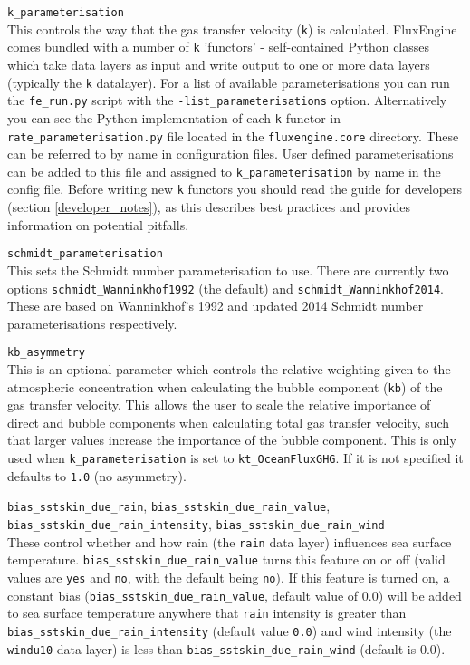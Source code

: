 \documentclass[]{scrartcl}
\newcommand{\conflistingsep}{\vspace{0.40cm}}
\begin{document}
\conflistingsep \noindent \texttt{k\_parameterisation}\\
This controls the way that the gas transfer velocity (\texttt{k}) is calculated. FluxEngine comes bundled with a number of \texttt{k} 'functors' - self-contained Python classes which take data layers as input and write output to one or more data layers (typically the \texttt{k} datalayer). For a list of available parameterisations you can run the \texttt{fe\_run.py} script with the \texttt{-list\_parameterisations} option. Alternatively you can see the Python implementation of each \texttt{k} functor in \texttt{rate\_parameterisation.py} file located in the \texttt{fluxengine.core} directory. These can be referred to by name in configuration files. User defined parameterisations can be added to this file and assigned to \texttt{k\_parameterisation} by name in the config file. Before writing new \texttt{k} functors you should read the guide for developers (section \ref{developer_notes}), as this describes best practices and provides information on potential pitfalls.

\conflistingsep \noindent \texttt{schmidt\_parameterisation}\\
This sets the Schmidt number parameterisation to use. There are currently two options \texttt{schmidt\_Wanninkhof1992} (the default) and \texttt{schmidt\_Wanninkhof2014}. These are based  on Wanninkhof's 1992 \cite{Wanninkhof1992} and updated 2014 \cite{Wanninkhof12014} Schmidt number parameterisations respectively.

\conflistingsep \noindent \texttt{kb\_asymmetry}\\
This is an optional parameter which controls the relative weighting given to the atmospheric concentration when calculating the bubble component (\texttt{kb}) of the gas transfer velocity. This allows the user to scale the relative importance of direct and bubble components when calculating total gas transfer velocity, such that larger values increase the importance of the bubble component. This is only used when \texttt{k\_parameterisation} is set to \texttt{kt\_OceanFluxGHG}. If it is not specified it defaults to \texttt{1.0} (no asymmetry).

\conflistingsep \noindent \texttt{bias\_sstskin\_due\_rain}, \texttt{bias\_sstskin\_due\_rain\_value}, \texttt{bias\_sstskin\_due\_rain\_intensity}, \texttt{bias\_sstskin\_due\_rain\_wind}\\
These control whether and how rain (the \texttt{rain} data layer) influences sea surface temperature. \texttt{bias\_sstskin\_due\_rain\_value} turns this feature on or off (valid values are \texttt{yes} and \texttt{no}, with the default being \texttt{no}). If this feature is turned on, a constant bias (\texttt{bias\_sstskin\_due\_rain\_value}, default value of $0.0$) will be added to sea surface temperature anywhere that \texttt{rain} intensity is greater than \texttt{bias\_sstskin\_due\_rain\_intensity} (default value \texttt{0.0}) and wind intensity (the \texttt{windu10} data layer) is less than \texttt{bias\_sstskin\_due\_rain\_wind} (default is $0.0$).
\end{document}
